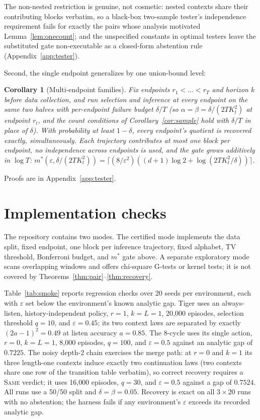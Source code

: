 \documentclass{article}
\newtheorem{corollary}[theorem]{Corollary}
\newcommand{\eps}{\varepsilon}
\begin{document}
The non-nested restriction is genuine, not cosmetic: nested contexts share
their contributing blocks verbatim, so a black-box two-sample tester's
independence requirement fails for exactly the pairs whose analysis
motivated Lemma~\ref{lem:onecount}; and the unspecified constants in
optimal testers leave the substituted gate non-executable as a closed-form
abstention rule (Appendix~\ref{app:tester}).

Second, the single endpoint generalizes by one union-bound level:

\begin{corollary}[Multi-endpoint families]\label{cor:multi}
Fix endpoints $r_1<\dots<r_T$ and horizon $k$ before data collection, and
run selection and inference at every endpoint on the same two halves with
per-endpoint failure budget $\delta/T$ (so $\alpha=\beta=\delta/(2TK_t^2)$
at endpoint $r_t$, and the count conditions of Corollary~\ref{cor:sample}
hold with $\delta/T$ in place of $\delta$).  With probability at least
$1-\delta$, every endpoint's quotient is recovered exactly,
simultaneously.  Each trajectory contributes at most one block per
endpoint, no independence across endpoints is used, and the gate grows
additively in $\log T$:
$m^*(\eps,\delta/(2TK_t^2))=\lceil(8/\eps^2)((d+1)\log2+
\log(2TK_t^2/\delta))\rceil$.
\end{corollary}

Proofs are in Appendix~\ref{app:tester}.

\section{Implementation checks}\label{sec:checks}

The repository contains two modes.  The certified mode implements the data
split, fixed endpoint, one block per inference trajectory, fixed alphabet,
TV threshold, Bonferroni budget, and $m^*$ gate above.  A separate exploratory
mode scans overlapping windows and offers chi-square G-tests or kernel tests;
it is not covered by Theorems~\ref{thm:pair}--\ref{thm:recovery}.

Table~\ref{tab:smoke} reports regression checks over 20 seeds per
environment, each with $\eps$ set below the environment's known analytic
gap.  Tiger \citep{cassandra1994acting} uses an always-listen,
history-independent policy, $r=1$,
$k=L=1$, 20{,}000 episodes, selection threshold $q=10$, and $\eps=0.45$; its
two context laws are separated by exactly $(2a-1)^2=0.49$ at listen accuracy
$a=0.85$.  The 8-cycle uses its single action, $r=0$, $k=L=1$, 8{,}000
episodes, $q=100$, and $\eps=0.5$ against an analytic gap of $0.7225$.  The
noisy depth-2 chain exercises the merge path: at $r=0$ and $k=1$ its three
length-one contexts induce exactly two continuation laws (two contexts share
one row of the transition table verbatim), so correct recovery requires a
\textsc{Same} verdict; it uses 16{,}000 episodes, $q=30$, and $\eps=0.5$
against a gap of $0.7524$.  All runs use a 50/50 split and
$\delta=\beta=0.05$.  Recovery is exact on all $3\times20$ runs with no
abstention; the harness fails if any environment's $\eps$ exceeds its
recorded analytic gap.
\end{document}
